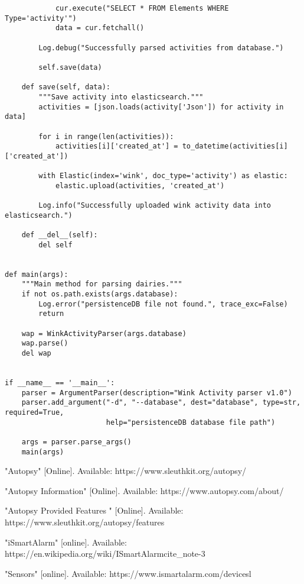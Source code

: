 \documentclass{easychair}
\begin{document}
\begin{enumerate}
\begin{lstlisting}
            cur.execute("SELECT * FROM Elements WHERE Type='activity'")
            data = cur.fetchall()

        Log.debug("Successfully parsed activities from database.")

        self.save(data)

    def save(self, data):
        """Save activity into elasticsearch."""
        activities = [json.loads(activity['Json']) for activity in data]

        for i in range(len(activities)):
            activities[i]['created_at'] = to_datetime(activities[i]['created_at'])

        with Elastic(index='wink', doc_type='activity') as elastic:
            elastic.upload(activities, 'created_at')

        Log.info("Successfully uploaded wink activity data into elasticsearch.")

    def __del__(self):
        del self


def main(args):
    """Main method for parsing dairies."""
    if not os.path.exists(args.database):
        Log.error("persistenceDB file not found.", trace_exc=False)
        return

    wap = WinkActivityParser(args.database)
    wap.parse()
    del wap


if __name__ == '__main__':
    parser = ArgumentParser(description="Wink Activity parser v1.0")
    parser.add_argument("-d", "--database", dest="database", type=str, required=True,
                        help="persistenceDB database file path")

    args = parser.parse_args()
    main(args)

\end{lstlisting}

\begin{thebibliography}{1}

"Autopsy" [Online]. Available: https://www.sleuthkit.org/autopsy/

"Autopsy Information" [Online]. Available: https://www.autopsy.com/about/

"Autopsy Provided Features " [Online]. Available: https://www.sleuthkit.org/autopsy/features

"iSmartAlarm" [online]. Available:  https://en.wikipedia.org/wiki/ISmartAlarmcite\_note-3

"Sensors" [online]. Available: https://www.ismartalarm.com/devicesl


\end{thebibliography}
\end{enumerate}
\end{document}

